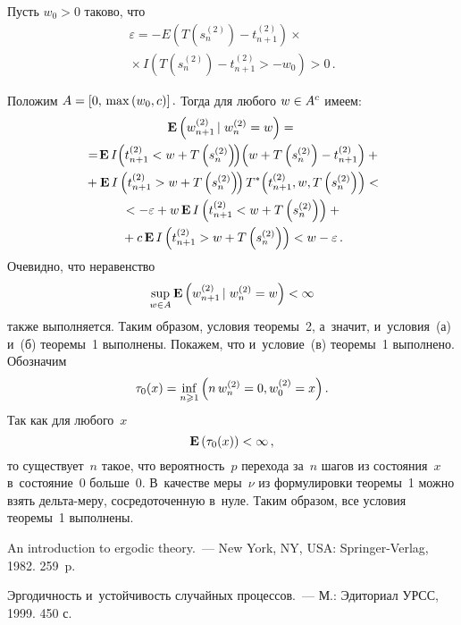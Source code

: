 \begin{multicols}{2}
Пусть $w_{0}>0$ таково, что
\begin{multline*}
\varepsilon=-E\left(T\left(s_n^{(2)}\right)-t_{n+1}^{(2)}\right)\times{}\\
{}\times
I\left(T\left(s_n^{(2)}\right)-t_{n+1}^{(2)}>-w_0\right)>0\,.
\end{multline*}

Положим $A\hm=\left[0,\,\max\left(w_0,c\right)\right].$ Тогда для
любого $w\hm\in A^{c}$ имеем:
\begin{multline*}
\mathbf{E} \left(w_{n+1}^{(2)}\left|\right.w_{n}^{(2)}=w\right)={}\\
{}=\!
\mathbf{E}\,
I\!\left(t_{n+1}^{(2)}<w+T\left(s_n^{(2)}\right)\!\right)\!
\left(w+T\left(s_n^{(2)}\right)-t_{n+1}^{(2)}\right)+{}\hspace*{-0.64064pt}
\\
{}+\mathbf{E}\,
I\left(t_{n+1}^{(2)}>w+T\left(s_n^{(2)}\right)\!\right)T^{\ast}\!\left(t_{n+1}^{(2)},
w,T\left(s_n^{(2)}\right)\right)<{}\hspace*{-1.91495pt}\\
{}< -\varepsilon+w\,\mathbf{E}\,
I\left(t_{n+1}^{(2)}< w+
T\left(s_n^{(2)}\right)\right)+{}\\
{}+
c\,\mathbf{E}\, I\left(t_{n+1}^{(2)}>w+T\left(s_n^{(2)}\right)\right)< w-\varepsilon\,.
\end{multline*}
Очевидно, что неравенство 
$$
\sup\limits_{w\in A}\mathbf{E}
\left(w_{n+1}^{(2)}\left|\right.w_{n}^{(2)}\hm=w\right)<\infty$$
 также
выполняется. Таким образом, условия тео\-ре\-мы~2, а~значит, и~условия~(а)
и~(б) тео\-ре\-мы~1 выполнены. Покажем, что и~усло\-вие~(в) тео\-ре\-мы~1
выполнено. Обозначим 
$$
\tau_0(x)=\inf\limits_{n\geqslant 1}\left(n\, w_n^{(2)}=0,w_0^{(2)}\hm=x\right).
$$ 
Так как для любого~$x$
$$\mathbf{E}\left(\tau_0(x)\right)\hm<\infty\,,
$$ 
то существует~$n$ такое, что
вероятность~$p$ перехода за~$n$ шагов из со\-сто\-яния~$x$ в~со\-сто\-яние~$0$ 
больше~0. В~качестве меры~$\nu$ из формулировки теоремы~1
мож\-но взять дель\-та-ме\-ру, сосредоточенную в~нуле. Таким образом, все
условия тео\-ре\-мы~1 выполнены.

{\small\frenchspacing
 {%
 \begin{thebibliography}{9}


 An introduction to ergodic
theory.~--- New York, NY, USA: Springer-Verlag, 1982. 259~p.

 Эргодичность и~устой\-чи\-вость случайных
процессов.~--- М.: Эдиториал УРСС, 1999. 450 с.


\end{thebibliography}}}
\end{multicols}

